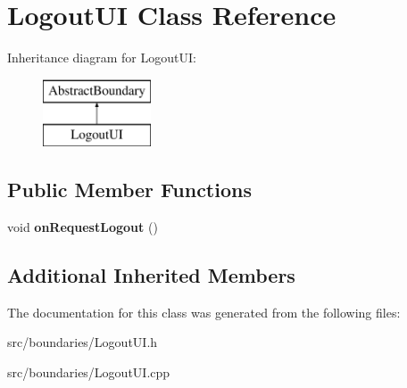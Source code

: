 \hypertarget{class_logout_u_i}{}\section{Logout\+UI Class Reference}
\label{class_logout_u_i}
Inheritance diagram for Logout\+UI\+:\begin{figure}[H]
\begin{center}
\leavevmode
\includegraphics[height=2.000000cm]{class_logout_u_i}
\end{center}
\end{figure}
\subsection*{Public Member Functions}
\begin{DoxyCompactItemize}
\item 
\mbox{\label{class_logout_u_i_a02c30caf68fb9a3fd9b094b19c18af81}} 
void {\bfseries on\+Request\+Logout} ()
\end{DoxyCompactItemize}
\subsection*{Additional Inherited Members}


The documentation for this class was generated from the following files\+:\begin{DoxyCompactItemize}
\item 
src/boundaries/Logout\+U\+I.\+h\item 
src/boundaries/Logout\+U\+I.\+cpp\end{DoxyCompactItemize}

